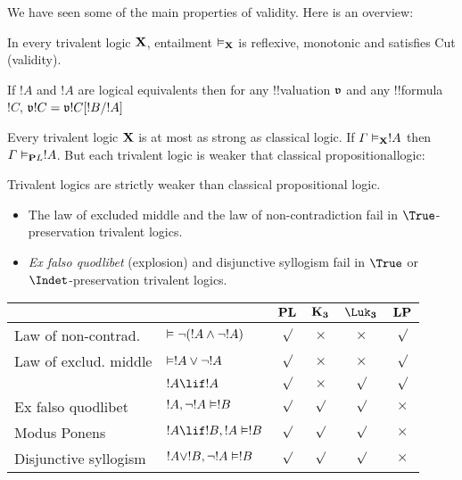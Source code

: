 \documentclass[../../../include/open-logic-section]{subfiles}
\begin{document}


We have seen some of the main properties of validity. Here is an overview:

\begin{prop}
In every trivalent logic $\Log X$, entailment $\Entails[\Log X]$ is reflexive, monotonic and satisfies Cut (validity).
\end{prop}

\begin{prop}
If $!A$ and $!A$ are logical equivalents then for any !!{valuation} $\pAssign{v}$ and any !!{formula} $!C$, $\pAssign{v}{!C}=\pAssign{v}{\Subst{!C}{!B}{!A}}$
\end{prop}

\begin{prop}
  \item Every trivalent logic $\Log X$ is at most as strong as classical logic. If $\Gamma \Entails[\Log X] !A$ then $\Gamma \Entails[\Log PL] !A$. But each trivalent logic is weaker that classical propositionallogic:
\end{prop}

\begin{prop}
 Trivalent logics are strictly weaker than classical propositional logic.
\begin{itemize}
  \item The law of excluded middle and the law of non-contradiction fail in $\True$-preservation trivalent logics.
  \item \emph{Ex falso quodlibet} (explosion) and disjunctive syllogism fail in $\True$ or $\Indet$-preservation trivalent logics.
\end{itemize}
\end{prop}

\begin{center}
  \begin{tabular}{|ll|cccc|} \hline 
     &  & $\Log{PL}$ &$\Log{K_3}$ & $\Log{\Luk_3}$ & $\Log{LP}$ \\
     \hline 
    Law of non-contrad. & $\Entails \lnot (!A \land \lnot !A)$ & $\surd$ & $\times$ & $\times$ & $\surd$ \\
    Law of exclud. middle & $\Entails !A \lor \lnot !A$ & $\surd$ & $\times$ & $\times$ & $\surd$ \\
     & $!A \lif !A$ & $\surd$ & $\times$ & $\surd$ & $\surd$ \\
    Ex falso quodlibet & $!A, \lnot !A \Entails !B$ & $\surd$ & $\surd$ & $\surd$ & $\times$ \\
    Modus Ponens & $!A \lif !B, !A \Entails !B$ & $\surd$ & $\surd$ & $\surd$ & $\times$ \\
    Disjunctive syllogism & $!A \lor !B, \lnot !A \Entails !B$ & $\surd$ & $\surd$ & $\surd$ & $\times$ \\
    \hline 
  \end{tabular}
\end{center}
\end{document}
